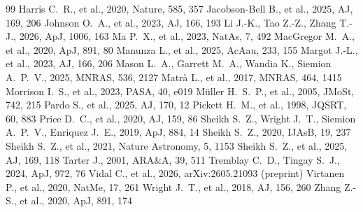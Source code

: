 \documentclass[twocolumn,twocolappendix]{openjournal}
\begin{document}
\begin{thebibliography}{99}
 Harris C.~R., et al., 2020, Nature, 585, 357
 Jacobson-Bell B., et al., 2025, AJ, 169, 206
 Johnson O.~A., et al., 2023, AJ, 166, 193
 Li J.-K., Tao Z.-Z., Zhang T.-J., 2026, ApJ, 1006, 163
 Ma P.~X., et al., 2023, NatAs, 7, 492
 MacGregor M.~A., et al., 2020, ApJ, 891, 80
 Manunza L., et al., 2025, AcAau, 233, 155
 Margot J.-L., et al., 2023, AJ, 166, 206
 Mason L.~A., Garrett M.~A., Wandia K., Siemion A.~P.~V., 2025, MNRAS, 536, 2127
 Matrà L., et al., 2017, MNRAS, 464, 1415
 Morrison I.~S., et al., 2023, PASA, 40, e019
 M\"uller H.~S.~P., et al., 2005, JMoSt, 742, 215
 Pardo S., et al., 2025, AJ, 170, 12
 Pickett H.~M., et al., 1998, JQSRT, 60, 883
 Price D.~C., et al., 2020, AJ, 159, 86
 Sheikh S.~Z., Wright J.~T., Siemion A.~P.~V., Enriquez J.~E., 2019, ApJ, 884, 14
 Sheikh S.~Z., 2020, IJAsB, 19, 237
 Sheikh S.~Z., et al., 2021, Nature Astronomy, 5, 1153
 Sheikh S.~Z., et al., 2025, AJ, 169, 118
 Tarter J., 2001, ARA\&A, 39, 511
 Tremblay C.~D., Tingay S.~J., 2024, ApJ, 972, 76
 Vidal C., et al., 2026, arXiv:2605.21093 (preprint)
 Virtanen P., et al., 2020, NatMe, 17, 261
 Wright J.~T., et al., 2018, AJ, 156, 260
 Zhang Z.-S., et al., 2020, ApJ, 891, 174
\end{thebibliography}
\end{document}
